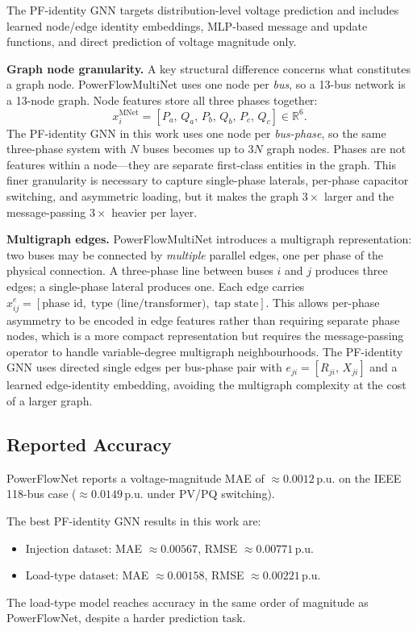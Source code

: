 \documentclass[11pt]{article}
\begin{document}
The PF-identity GNN targets distribution-level voltage prediction and
includes learned node/edge identity embeddings, MLP-based message and
update functions, and direct prediction of voltage magnitude only.

\medskip
\noindent\textbf{Graph node granularity.}
A key structural difference concerns what constitutes a graph node.
PowerFlowMultiNet uses one node per \emph{bus}, so a 13-bus network is a
13-node graph.  Node features store all three phases together:
\[
x_i^{\text{MNet}} = [P_a,\,Q_a,\,P_b,\,Q_b,\,P_c,\,Q_c] \in \mathbb{R}^6.
\]
The PF-identity GNN in this work uses one node per \emph{bus-phase}, so the
same three-phase system with $N$ buses becomes up to $3N$ graph nodes.
Phases are not features within a node---they are separate first-class
entities in the graph.  This finer granularity is necessary to capture
single-phase laterals, per-phase capacitor switching, and asymmetric loading,
but it makes the graph $3\times$ larger and the message-passing $3\times$
heavier per layer.

\noindent\textbf{Multigraph edges.}
PowerFlowMultiNet introduces a multigraph representation: two buses may be
connected by \emph{multiple} parallel edges, one per phase of the physical
connection.  A three-phase line between buses $i$ and $j$ produces three
edges; a single-phase lateral produces one.  Each edge carries
$x^e_{ij} = [\text{phase id},\;\text{type (line/transformer)},\;\text{tap state}]$.
This allows per-phase asymmetry to be encoded in edge features rather than
requiring separate phase nodes, which is a more compact representation but
requires the message-passing operator to handle variable-degree multigraph
neighbourhoods.  The PF-identity GNN uses directed single edges per
bus-phase pair with $e_{ji} = [R_{ji},\,X_{ji}]$ and a learned edge-identity
embedding, avoiding the multigraph complexity at the cost of a larger graph.

\subsection{Reported Accuracy}

PowerFlowNet reports a voltage-magnitude MAE of ${\approx}0.0012\,\text{p.u.}$
on the IEEE 118-bus case (${\approx}0.0149\,\text{p.u.}$ under PV/PQ switching).

The best PF-identity GNN results in this work are:
\begin{itemize}
  \item Injection dataset: MAE $\approx 0.00567$, RMSE $\approx 0.00771$\,p.u.
  \item Load-type dataset: MAE $\approx 0.00158$, RMSE $\approx 0.00221$\,p.u.
\end{itemize}
The load-type model reaches accuracy in the same order of magnitude as
PowerFlowNet, despite a harder prediction task.
\end{document}
